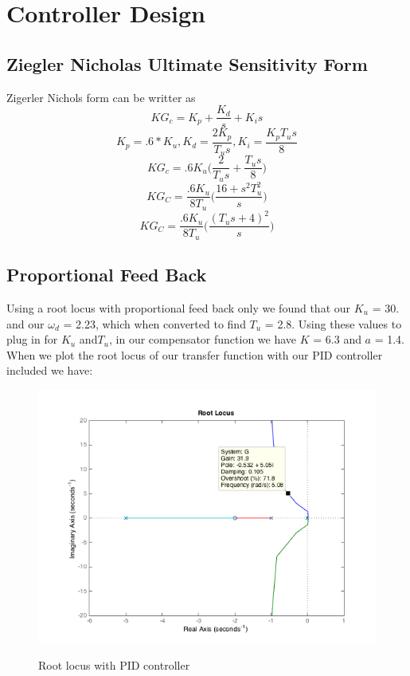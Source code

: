 \documentclass[english]{article}
\begin{document}
\section*{Controller Design}
	\subsection*{Ziegler Nicholas Ultimate Sensitivity Form}
	Zigerler Nichols form can be writter as  
	$$ KG_c = K_p + \frac{K_d }{s}+K_is $$
	$$K_p = .6 *K_u ,  K_d = \frac{2K_p}{T_u s} , K_i  = \frac{K_pT_u s}{8} $$ 
	$$ KG_c = .6K_u \big( \frac{2}{T_us} + \frac{T_u s}{8} \big) $$
	$$KG_C = \frac{.6K_u}{8T_u} \big( \frac{16 + s^2 T_u^2}{s} \big) $$  
	$$KG_C =\frac{.6K_u}{8T_u}\bigg( \frac{(T_us +4)^2}{s} \bigg) $$    
	
	\subsection*{Proportional Feed Back}
	Using a root locus with proportional feed back only we found that our $K_u$ = 30. and our $\omega_d$ = 2.23, which when converted to find $T_u$ = 2.8.   Using these values to plug in for $K_u$ and$T_u$, in our compensator function we have $K$ = 6.3 and $a$ = 1.4. 
When we plot the root locus of our transfer function with our PID controller included we have: 
\begin{figure}[h!]
\includegraphics[width = \linewidth]{32gain_a2.png}
\label{fig:3_a}
\caption{Root locus with PID controller}
\end{figure}
\FloatBarrier
\end{document}
